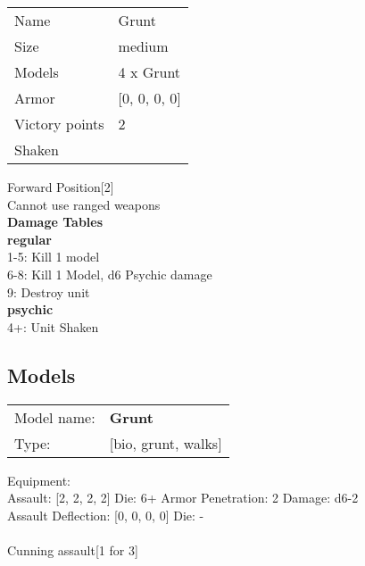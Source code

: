 \begin{tabular}{ll}
  Name & Grunt \\
  Size & medium\\
  Models & 4 x Grunt\\
  Armor & [0, 0, 0, 0]\\
  Victory points & 2\\
  Shaken & \\
\end{tabular}

Forward Position[2]\\ 
Cannot use ranged weapons\\ 



{\bf Damage Tables} \\
 {\bf regular } \\
1-5: Kill 1 model \\
6-8: Kill 1 Model, d6 Psychic damage \\
9: Destroy unit \\
 {\bf psychic } \\
4+: Unit Shaken \\


\clearpage

\subsection{ Models }

\begin{tabular}{ll}
Model name: & {\bf Grunt } \\
Type: & [bio, grunt, walks] \\
\end{tabular}

Equipment:  \\

Assault: [2, 2, 2, 2] Die: 6+ Armor Penetration: 2 Damage: d6-2 \\
Assault Deflection: [0, 0, 0, 0] Die: -\\
\\ 
Cunning assault[1 for 3]\\ 
 



 















